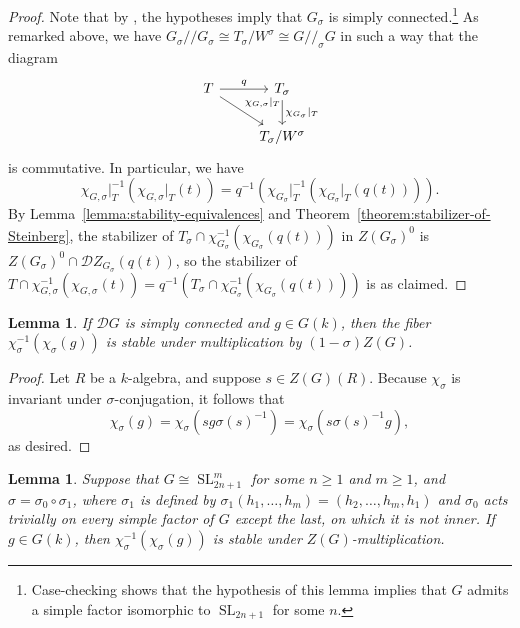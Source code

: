 \documentclass[11pt,reqno]{amsart}
\newtheorem{lemma}[theorem]{Lemma}
\theoremstyle{definition}
\newcommand{\sD}{{\mathscr D}}
\DeclareMathOperator{\SL}{SL}
\begin{document}
\begin{proof}
    Note that by \cite[Corollary 1(i)]{Springer-twisted}, the hypotheses imply that $G_\sigma$ is simply connected.\footnote{Case-checking shows that the hypothesis of this lemma implies that $G$ admits a simple factor isomorphic to $\SL_{2n+1}$ for some $n$.} As remarked above, we have $G_\sigma/\!/G_\sigma \cong T_\sigma/W^\sigma \cong G/\!/_\sigma G$ in such a way that the diagram
    \[
    \begin{tikzcd}
        T \arrow[r, "q"] \arrow[rd, "\chi_{G,\sigma}|_T"]
            &T_\sigma \arrow[d, "\chi_{G_\sigma}|_T"] \\
            &T_\sigma/W^\sigma
    \end{tikzcd}
    \]
    is commutative. In particular, we have
    \[
    \chi_{G,\sigma}|_T^{-1}(\chi_{G,\sigma}|_T(t)) = q^{-1}(\chi_{G_\sigma}|_T^{-1}(\chi_{G_\sigma}|_T(q(t)))).
    \]
    By Lemma~\ref{lemma:stability-equivalences} and Theorem~\ref{theorem:stabilizer-of-Steinberg}, the stabilizer of $T_\sigma \cap \chi_{G_\sigma}^{-1}(\chi_{G_\sigma}(q(t)))$ in $Z(G_\sigma)^0$ is $Z(G_\sigma)^0 \cap \sD Z_{G_\sigma}(q(t))$, so the stabilizer of $T \cap \chi_{G,\sigma}^{-1}(\chi_{G,\sigma}(t)) = q^{-1}(T_\sigma \cap \chi_{G_\sigma}^{-1}(\chi_{G_\sigma}(q(t))))$ is as claimed.
\end{proof}


\begin{lemma}\label{lemma:invariant-by-coinvariants}
    If $\sD G$ is simply connected and $g \in G(k)$, then the fiber $\chi_\sigma^{-1}(\chi_\sigma(g))$ is stable under multiplication by $(1-\sigma)Z(G)$.
\end{lemma}

\begin{proof}
    Let $R$ be a $k$-algebra, and suppose $s \in Z(G)(R)$. Because $\chi_\sigma$ is invariant under $\sigma$-conjugation, it follows that
    \[
    \chi_\sigma(g) = \chi_\sigma(sg\sigma(s)^{-1}) = \chi_\sigma(s\sigma(s)^{-1}g),
    \]
    as desired.
\end{proof}

\begin{lemma}\label{lemma:stabilizer-in-type-A}
    Suppose that $G \cong \SL_{2n+1}^m$ for some $n \geq 1$ and $m \geq 1$, and $\sigma = \sigma_0 \circ \sigma_1$, where $\sigma_1$ is defined by $\sigma_1(h_1, \dots, h_m) = (h_2, \dots, h_m, h_1)$ and $\sigma_0$ acts trivially on every simple factor of $G$ except the last, on which it is not inner. If $g \in G(k)$, then $\chi_\sigma^{-1}(\chi_\sigma(g))$ is stable under $Z(G)$-multiplication.
\end{lemma}
\end{document}
